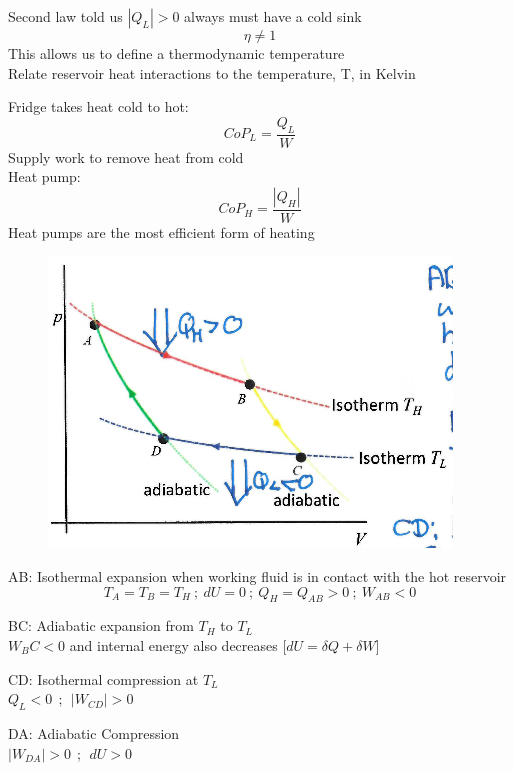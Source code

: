 \documentclass[a4paper, 11pt, normalem]{report}
\begin{document}
Second law told us $|Q_L| > 0$ always must have a cold sink
$$\eta \neq 1$$
This allows us to define a thermodynamic temperature \\
Relate reservoir heat interactions to the temperature, T, in Kelvin

Fridge takes heat cold to hot:
\begin{equation*}
    CoP_{L} = \frac{Q_L}{W}
\end{equation*}
Supply work to remove heat from cold \\
Heat pump:
\begin{equation*}
    CoP_H = \frac{|Q_H|}{W}
\end{equation*}
Heat pumps are the most efficient form of heating

\begin{figure}
    \begin{center}
        \includegraphics[scale=0.4]{Adiab.png}
        \vspace{-20pt}
    \end{center}
\end{figure}

AB: Isothermal expansion when working fluid is in contact with the hot reservoir
\begin{equation*}
    T_A = T_B = T_H ~;~ dU = 0 ~;~ Q_H = Q_{AB} > 0 ~;~ W_{AB} < 0
\end{equation*}

BC: Adiabatic expansion from $T_H$ to $T_L$ \\
          $W_BC < 0$ and internal energy also decreases [$dU = \delta Q + \delta W$]

CD: Isothermal compression at $T_L$ \\
          $Q_L < 0 ~~;~~ |W_{CD}| > 0$

DA: Adiabatic Compression \\
          $|W_{DA}| > 0 ~~;~~ dU > 0$
\end{document}
